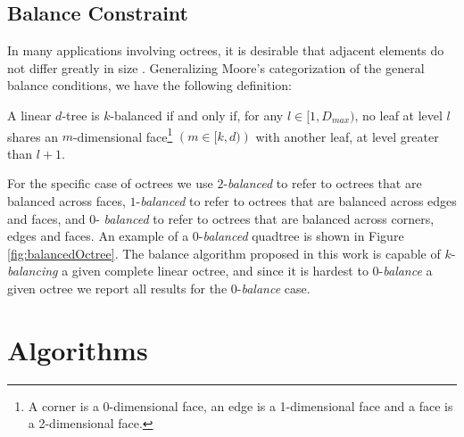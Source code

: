 \subsection{Balance Constraint}
\label{sec:balanceConstraint}
In many applications involving octrees, it is desirable that adjacent
elements do not differ greatly in size
\cite{herzen87,kim02,tu05}. Generalizing Moore's \cite{moore95}
categorization of the general balance conditions, we have the
following definition:
\begin{define}
A linear $d$-tree is $k$-balanced if and only if, for any $l \in
[1,D_{max})$, no leaf at level $l$ shares an $m$-dimensional
face\footnote{A corner is a 0-dimensional face, an edge is a
1-dimensional face and a face is a 2-dimensional face.} $\left( m \in
[k,d) \right)$ with another leaf, at level greater than $l+1$.
\end{define}

For the specific case of octrees we use $2$-{\em balanced} to refer to
octrees that are balanced across faces, $1$-{\em balanced} to refer to
octrees that are balanced across edges and faces, and $0$-{\em
balanced} to refer to octrees that are balanced across corners, edges
and faces. An example of a $0$-{\em balanced} quadtree is shown in
Figure \ref{fig:balancedOctree}. The balance algorithm proposed in
this work is capable of $k$-{\em balancing} a given complete linear
octree, and since it is hardest to $0$-{\em balance} a given octree we
report all results for the $0$-{\em balance} case.



\section{Algorithms}
\label{sec:methods}

